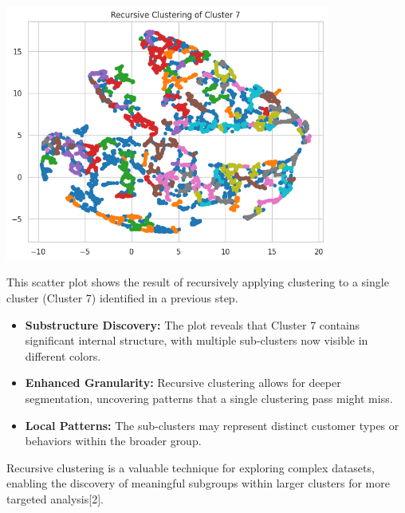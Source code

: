 \documentclass[a4paper]{article}
\begin{document}
\begin{multicols}{2}
\noindent
\begin{minipage}{\columnwidth}
\centering
\includegraphics[width=0.8\textwidth]{Recursive Clustering.png}
\label{fig:recursive_clustering}
\end{minipage}

This scatter plot shows the result of recursively applying clustering to a single cluster (Cluster 7) identified in a previous step.

\begin{itemize}
    \item \textbf{Substructure Discovery:} The plot reveals that Cluster 7 contains significant internal structure, with multiple sub-clusters now visible in different colors.
    \item \textbf{Enhanced Granularity:} Recursive clustering allows for deeper segmentation, uncovering patterns that a single clustering pass might miss.
    \item \textbf{Local Patterns:} The sub-clusters may represent distinct customer types or behaviors within the broader group.
\end{itemize}

Recursive clustering is a valuable technique for exploring complex datasets, enabling the discovery of meaningful subgroups within larger clusters for more targeted analysis[2].

\vspace{1em}


\end{multicols}
\end{document}
